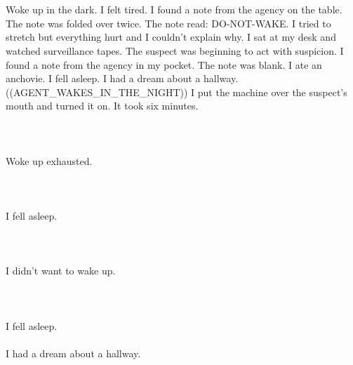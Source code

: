\documentclass{article}
\begin{document}
    \section{}
    Woke up in the dark. I felt tired. I found a note from the agency on the table. The note was folded over twice. The note read: DO-NOT-WAKE. I tried to stretch but everything hurt and I couldn't explain why. I sat at my desk and watched surveillance tapes. The suspect was beginning to act with suspicion. I found a note from the agency in my pocket. The note was blank. I ate an anchovie. I fell asleep. I had a dream about a hallway. ((AGENT_WAKES_IN_THE_NIGHT)) I put the machine over the suspect's mouth and turned it on. It took six minutes. \\\\
    \newpage
    
    \section{}
    Woke up exhausted.\\\\ 
    \newpage
    
    \section{}
    I fell asleep.\\\\ 
    \newpage
    
    \section{}
    I didn't want to wake up.\\\\ 
    \newpage
    
    \section{}
    I fell asleep.\\\\I had a dream about a hallway.\\\\ 
    \newpage
    
    
\end{document}
